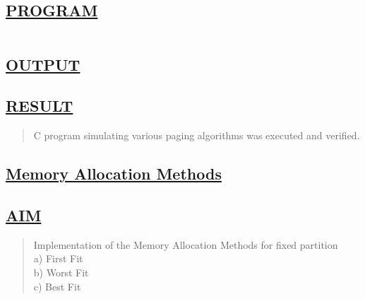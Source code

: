 \documentclass[a4paper, 12pt]{article}
\begin{document}
\subsection*{\underline{PROGRAM}}
\begin{quote}
\inputminted[fontsize=\small,breaklines,breakanywhere]{c}{page_replacement.c}
\end{quote}

\newpage
\subsection*{\underline{OUTPUT}}

\begin{figure}[H] 
    \centering
\end{figure}


\subsection*{\underline{RESULT}}
\begin{quote}
C program simulating various paging algorithms was executed and verified.
\end{quote}

\newpage
\begin{center}
\section*{\LARGE \textbf{\underline{Memory Allocation Methods}}} 
\end{center}

\subsection*{\underline{AIM}}
\begin{quote}
Implementation of the Memory Allocation Methods for fixed partition\\
a) First Fit\\
b) Worst Fit\\
c) Best Fit\\
\end{quote}
\end{document}
